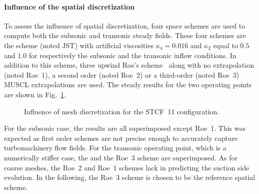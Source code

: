 \paragraph{Influence of the spatial discretization}
To assess the influence of spatial discretization, four space schemes are
used to compute both the subsonic and transonic steady fields. These
four schemes are the \citet{Jameson1981} scheme (noted JST) with artificial
viscosities $\kappa_4 = 0.016$
and $\kappa_2$ equal to $0.5$ and $1.0$ for respectively the subsonic and the transonic
inflow conditions. In addition to this scheme, three upwind
Roe's scheme~\cite{Roe1981} along with no extrapolation (noted Roe~1),
a second order (noted Roe~2) or a third-order (noted Roe~3) 
MUSCL extrapolations are used.
The steady results for the two operating points are shown 
in Fig.~\ref{fig:stcf11_space_scheme_convergence}.
\begin{figure}[htp]
  \centering
  \caption{Influence of mesh discretization for the STCF~11 configuration.}
  \label{fig:stcf11_space_scheme_convergence}
\end{figure}
For the subsonic case, the results are all superimposed except Roe~1. 
This was expected as first order schemes
are not precise enough to accurately capture turbomachinery flow fields.
For the transonic operating point, which is a numerically stiffer case,
the \citet{Jameson1981} and the Roe~3 scheme are superimposed.
As for coarse meshes, the Roe~2 and Roe~1 schemes
lack in predicting the suction side evolution. In the following,
the Roe~3 scheme is chosen to be the reference spatial scheme.

